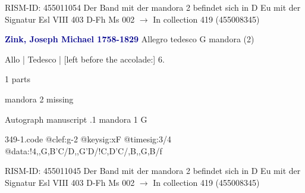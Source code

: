 \documentclass[twocolumn]{book}
\begin{document}
\newline RISM-ID: 455011054
\newline Der Band mit der mandora 2 befindet sich in D Eu mit der Signatur Esl VIII 403
\newline D-Fh  Ms 002
\newline $\rightarrow$ In collection 419 (455008345)

\newline \par \vspace{7pt} \textcolor{darkblue}{\textbf{Zink, Joseph Michael  1758-1829}}
\newline Allegro tedesco  G  
\newline mandora (2)
\newline \begin{itshape}[f.8v, at left:] Allo | Tedesco | [left before the accolade:] 6.\end{itshape} 
\newline \textcolor{darkblue}{}  1 parts  
\newline \begin{small} mandora 2 missing\end{small} 
\newline Autograph manuscript
.1  mandora 1  G  
\begin{filecontents*}{349-1.code}
@clef:g-2
@keysig:xF
@timesig:3/4
@data:!4,,G,B'C/D,,G'D/!C,D'C/,B,,G,B/f
\end{filecontents*}
\newline
%

\newline RISM-ID: 455011045
\newline Der Band mit der mandora 2 befindet sich in D Eu mit der Signatur Esl VIII 403
\newline D-Fh  Ms 002
\newline $\rightarrow$ In collection 419 (455008345)
\end{document}

